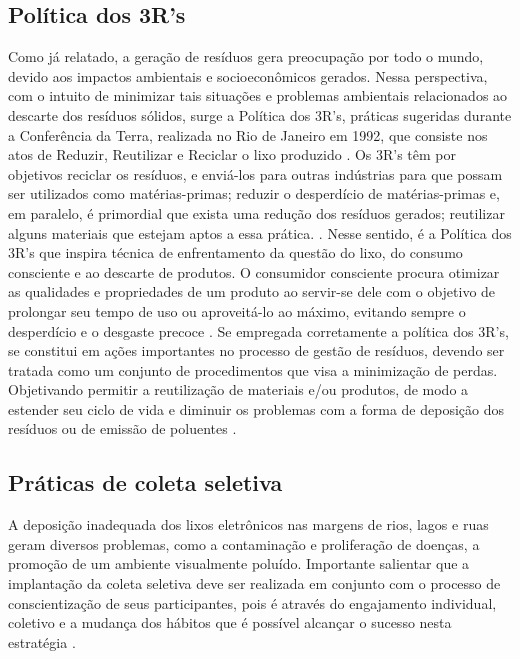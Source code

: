 \documentclass[
	12pt,				%
	openany,			%
	twoside,			%
	a4paper,			%
	english,			%
	french,				%
	spanish,			%
	brazil				%
	]{abntex2}
\begin{document}
\subsection{Política dos 3R’s}

Como já relatado, a geração de resíduos gera preocupação por todo o mundo, devido aos impactos ambientais e socioeconômicos gerados. Nessa perspectiva, com o intuito de minimizar tais situações e problemas ambientais relacionados ao descarte dos resíduos sólidos, surge a Política dos 3R’s, práticas sugeridas durante a Conferência da Terra, realizada no Rio de Janeiro em 1992, que consiste nos atos de Reduzir, Reutilizar e Reciclar o lixo produzido \cite{mmufasm}.
Os 3R’s têm por objetivos reciclar os resíduos, e enviá-los para outras indústrias para que possam ser utilizados como matérias-primas; reduzir o desperdício de matérias-primas e, em paralelo, é primordial que exista uma redução dos resíduos gerados; reutilizar alguns materiais que estejam aptos a essa prática. \cite{ajsr}.
Nesse sentido, é a Política dos 3R’s que inspira técnica de enfrentamento da questão do lixo, do consumo consciente e ao descarte de produtos. O consumidor consciente procura otimizar as qualidades e propriedades de um produto ao servir-se dele com o objetivo de prolongar seu tempo de uso ou aproveitá-lo ao máximo, evitando sempre o desperdício e o desgaste precoce \cite{aflrsssfqaa}. 
Se empregada corretamente a política dos 3R’s, se constitui em ações importantes no processo de gestão de resíduos, devendo ser tratada como um conjunto de procedimentos que visa a minimização de perdas.  Objetivando permitir a reutilização de materiais e/ou produtos, de modo a estender seu ciclo de vida e diminuir os problemas com a forma de deposição dos resíduos ou de emissão de poluentes \cite{nmca}. 

\subsection{Práticas de coleta seletiva}
A deposição inadequada dos lixos eletrônicos nas margens de rios, lagos e ruas geram diversos problemas, como a contaminação e proliferação de doenças, a promoção de um ambiente visualmente poluído. Importante salientar que a implantação da coleta seletiva deve ser realizada em conjunto com o processo de conscientização de seus participantes, pois é através do engajamento individual, coletivo e a mudança dos hábitos que é possível alcançar o sucesso nesta estratégia \cite{jkmnusc}. 
\end{document}
